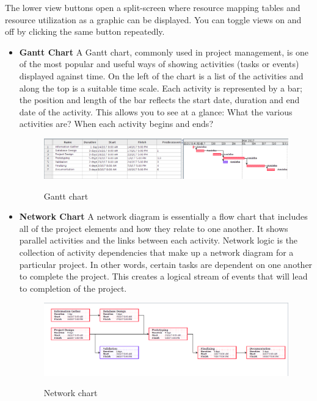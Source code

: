The lower view buttons open a split-screen where resource mapping tables and resource utilization as a graphic can be displayed. You can toggle views on and off by clicking the same button repeatedly.
\begin{itemize}
\item \textbf{Gantt Chart }
A Gantt chart, commonly used in project management, is one of the most popular and useful ways of showing activities (tasks or events) displayed against time. On the left of the chart is a list of the activities and along the top is a suitable time scale. Each activity is represented by a bar; the position and length of the bar reflects the start date, duration and end date of the activity. This allows you to see at a glance: 
What the various activities are?
When each activity begins and ends?
\begin{figure}[!ht]
\centering
\includegraphics[width=1\linewidth]{input/images/am_gantt.png}
\label{fig:image1}
\caption{Gantt chart}
\end{figure}

\item\textbf{ Network Chart}
A network diagram is essentially a flow chart that includes all of the project elements and how they relate to one another. It shows parallel activities and the links between each activity. Network logic is the collection of activity dependencies that make up a network diagram for a particular project. In other words, certain tasks are dependent on one another to complete the project. This creates a logical stream of events that will lead to completion of the project.

\begin{figure}[!ht]
\centering
\includegraphics[width=1\linewidth]{input/images/am_ne.png}
\label{fig:image1}
\caption{Network chart}
\end{figure}


\end{itemize}
